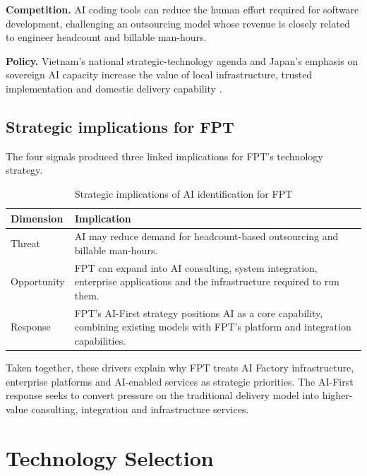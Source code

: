 \documentclass[a4paper,12pt]{report}
\begin{document}
\textbf{Competition.} AI coding tools can reduce the human effort required for software development, challenging an outsourcing model whose revenue is closely related to engineer headcount and billable man-hours.

\textbf{Policy.} Vietnam's national strategic-technology agenda and Japan's emphasis on sovereign AI capacity increase the value of local infrastructure, trusted implementation and domestic delivery capability \cite{A8,A15}.

\section{Strategic implications for FPT}

The four signals produced three linked implications for FPT's technology strategy.

\begin{table}[H]
\centering
\caption{Strategic implications of AI identification for FPT}
\label{tab:ai-identification}
\begin{tabular}{p{} p{}}
\toprule
\textbf{Dimension} & \textbf{Implication} \\
\midrule
Threat & AI may reduce demand for headcount-based outsourcing and billable man-hours. \\
Opportunity & FPT can expand into AI consulting, system integration, enterprise applications and the infrastructure required to run them. \\
Response & FPT's AI-First strategy positions AI as a core capability, combining existing models with FPT's platform and integration capabilities. \\
\bottomrule
\end{tabular}
\end{table}

Taken together, these drivers explain why FPT treats AI Factory infrastructure, enterprise platforms and AI-enabled services as strategic priorities. The AI-First response seeks to convert pressure on the traditional delivery model into higher-value consulting, integration and infrastructure services.


\chapter{Technology Selection}
\end{document}
